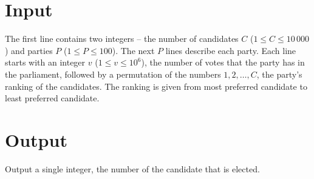 \section*{Input}
The first line contains two integers -- the number of candidates $C$ ($1 \le C \le 10\,000$) and parties $P$ ($1 \le P \le 100$).
The next $P$ lines describe each party.
Each line starts with an integer $v$ ($1 \le v \le 10^6$), the number of votes that the party has in the parliament, followed by a permutation of the numbers $1, 2, \dots, C$, the party's ranking of the candidates.
The ranking is given from most preferred candidate to least preferred candidate.

\section*{Output}
Output a single integer, the number of the candidate that is elected.
